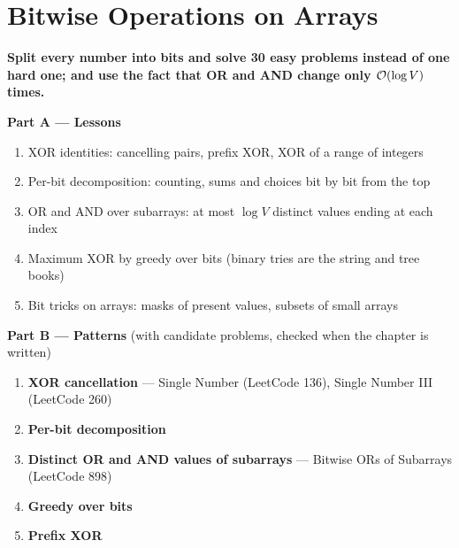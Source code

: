 \chapter{Bitwise Operations on Arrays}
\label{ch:bitwise}

\begin{tcolorbox}[enhanced, colback=white, colframe=secondaryblue, boxrule=1pt, arc=2mm]
\textbf{\large\textcolor{primaryblue}{Split every number into bits and solve 30 easy problems instead of one hard one; and use the fact that OR and AND change only $\mathcal{O}(\log V)$ times.}}
\end{tcolorbox}


\begin{plannedbox}
\textbf{Part A --- Lessons}
\begin{enumerate}[leftmargin=*, label=\textbf{A\arabic*.}, itemsep=1pt]
    \item XOR identities: cancelling pairs, prefix XOR, XOR of a range of integers
    \item Per-bit decomposition: counting, sums and choices bit by bit from the top
    \item OR and AND over subarrays: at most $\log V$ distinct values ending at each index
    \item Maximum XOR by greedy over bits (binary tries are the string and tree books)
    \item Bit tricks on arrays: masks of present values, subsets of small arrays
\end{enumerate}
\textbf{Part B --- Patterns} (with candidate problems, checked when the chapter is written)
\begin{enumerate}[leftmargin=*, label=\textbf{P\arabic*.}, itemsep=1pt]
    \item \textbf{XOR cancellation} --- Single Number {\small\color{darkgray}(LeetCode 136)}, Single Number III {\small\color{darkgray}(LeetCode 260)}
    \item \textbf{Per-bit decomposition}
    \item \textbf{Distinct OR and AND values of subarrays} --- Bitwise ORs of Subarrays {\small\color{darkgray}(LeetCode 898)}
    \item \textbf{Greedy over bits}
    \item \textbf{Prefix XOR}
\end{enumerate}
\end{plannedbox}
